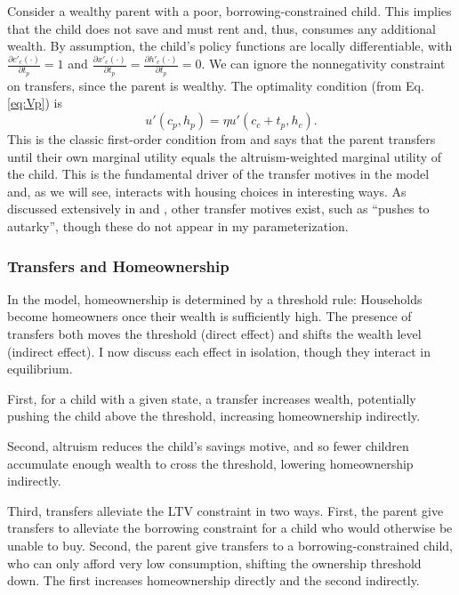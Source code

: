 \documentclass[12pt]{article}
\begin{document}
Consider a wealthy parent with a poor, borrowing-constrained child. This implies that the child does not save and must rent and, thus, consumes any additional wealth. By assumption, the child's policy functions are locally differentiable, with $\frac{\partial c'_c(\cdot)}{\partial t_p}=1$ and $\frac{\partial x'_c(\cdot)}{\partial t_p}=\frac{\partial h'_c(\cdot)}{\partial t_p}=0$. We can ignore the nonnegativity constraint on transfers, since the parent is wealthy. The optimality condition (from Eq. \ref{eq:Vp}) is
\begin{equation}\label{eq:FOC}
	u'(c_p,h_p) = \eta u'(c_c + t_p,h_c).
\end{equation}
This is the classic first-order condition from \cite{Altonji1997a} and says that the parent transfers until their own marginal utility equals the altruism-weighted marginal utility of the child. This is the fundamental driver of the transfer motives in the model and, as we will see, interacts with housing choices in interesting ways. As discussed extensively in \cite{Barczyk2020a} and \cite{Chu2020}, other transfer motives exist, such as ``pushes to autarky'', though these do not appear in my parameterization.

\subsubsection{Transfers and Homeownership}
In the model, homeownership is determined by a threshold rule: Households become homeowners once their wealth is sufficiently high. The presence of transfers both moves the threshold (direct effect) and shifts the wealth level (indirect effect). I now discuss each effect in isolation, though they interact in equilibrium.

First, for a child with a given state, a transfer increases wealth, potentially pushing the child above the threshold, increasing homeownership indirectly.

Second, altruism reduces the child's savings motive, and so fewer children accumulate enough wealth to cross the threshold, lowering homeownership indirectly.

Third, transfers alleviate the LTV constraint in two ways. First, the parent give transfers to alleviate the borrowing constraint for a child who would otherwise be unable to buy. Second, the parent give transfers to a borrowing-constrained child, who can only afford very low consumption, shifting the ownership threshold down. The first increases homeownership directly and the second indirectly.
\end{document}
